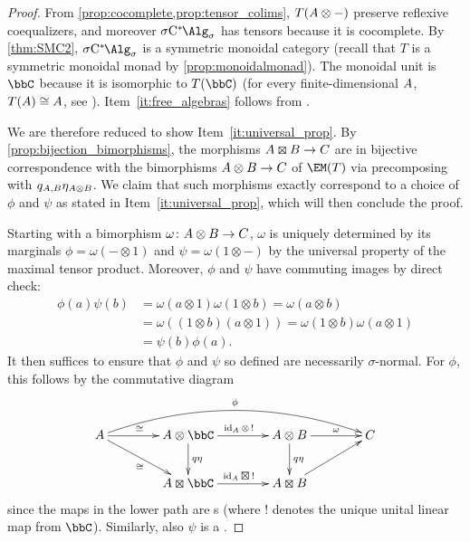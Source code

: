 \begin{proof}
	From \cref{prop:cocomplete,prop:tensor_colims}, $T({A} \otimes -)$ preserve reflexive coequalizers, and moreover $\SigmaC$ has tensors because it is cocomplete.
	By \cref{thm:SMC2}, $\SigmaC$ is a symmetric monoidal category (recall that $T$ is a symmetric monoidal monad by \cref{prop:monoidalmonad}).
	The monoidal unit is $\bbC$ because it is isomorphic to $T(\bbC)$ (for every finite-dimensional \cstar{} ${A}$, $T({A})\cong {A}$, see \cite[Example 3.3.16]{fritz2025categories}).
	Item~\ref{it:free_algebras} follows from \cite[2.5.3]{seal2013tensors}.

	We are therefore reduced to show Item~\ref{it:universal_prop}.
	By \cref{prop:bijection_bimorphisms}, the morphisms $\A \kocktensor \B \to \C$ are in bijective correspondence with the bimorphisms ${A}\otimes {B}\to{C}$ of $\EM(T)$ via precomposing with $q_{{A},{B}}\eta_{{A}\otimes {B}}$.
	We claim that such morphisms exactly correspond to a choice of $\phi$ and $\psi$ as stated in Item~\ref{it:universal_prop}, which will then conclude the proof.

	Starting with a bimorphism $\omega\colon {A}\otimes {B}\to {C}$, $\omega$ is uniquely determined by its marginals $\phi=\omega(-\otimes 1)$ and $\psi=\omega(1\otimes -)$ by the universal property of the maximal tensor product.
	Moreover, $\phi$ and $\psi$ have commuting images by direct check:
	\begin{equation*}
		\begin{split}
			\phi(a)\psi(b)&= \omega(a\otimes 1)\omega(1\otimes b) = \omega(a\otimes b) \\
			&= \omega((1\otimes b)(a\otimes 1))= \omega(1\otimes b)\omega(a\otimes 1) \\
			&= \psi(b)\phi(a).
		\end{split}
	\end{equation*}
	It then suffices to ensure that $\phi$ and $\psi$ so defined are necessarily $\sigma$-normal.
	For $\phi$, this follows by the commutative diagram
	\[
		\xymatrix@C=4em{
			\A\ar[r]^(0.45){\cong}\ar[rd]_{\cong}\ar@/^2em/[rrr]^{\phi} & \A \otimes \bbC \ar[r]^{\id_{\A}\otimes \, !}\ar[d]^{q\eta} & \A\otimes \B \ar[r]^-{\omega}\ar[d]^{q\eta}& \C\\
		&\A \kocktensor \bbC \ar[r]^{\id_{\A}\kocktensor \, !} & \A\kocktensor \B \ar[ru]&
		}
	\]
	since the maps in the lower path are \starshom{}s (where $!$ denotes the unique unital linear map from $\bbC$). Similarly, also $\psi$ is a \starshom.


\end{proof}
